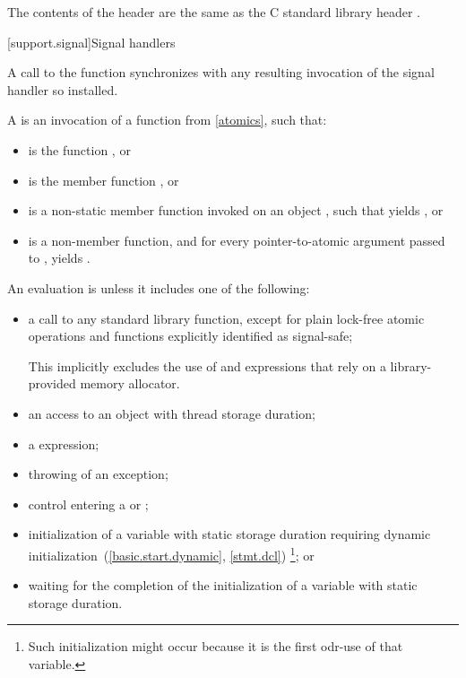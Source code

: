 \pnum
The contents of the header  are the same as the C
standard library header .

[support.signal]{Signal handlers}

\pnum
A call to the function  synchronizes with any resulting
invocation of the signal handler so installed.

\pnum
A  is
an invocation of a function  from \ref{atomics},
such that:
\begin{itemize}
\item
{} is the function , or

\item
{} is the member function , or

\item
{} is a non-static member function invoked on an object ,
such that  yields , or

\item
{} is a non-member function, and
for every pointer-to-atomic argument  passed to ,
 yields .
\end{itemize}

\pnum
{}%
An evaluation is  unless it includes one of the following:
\begin{itemize}
\item
a call to any standard library function,
except for plain lock-free atomic operations and
functions explicitly identified as signal-safe;
\begin{note}
This implicitly excludes the use of  and  expressions
that rely on a library-provided memory allocator.
\end{note}

\item
an access to an object with thread storage duration;

\item
a  expression;

\item
throwing of an exception;

\item
control entering a  or ;

\item
initialization of a variable with static storage duration
requiring dynamic initialization~(\ref{basic.start.dynamic}, \ref{stmt.dcl})%
\footnote{Such initialization might occur because it is the first odr-use of that variable.}; or

\item
waiting for the completion of the initialization of a variable with static storage duration.
\end{itemize}

